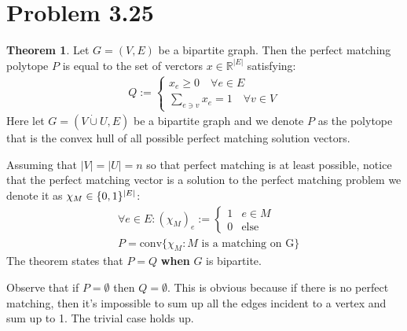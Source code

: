 \documentclass[]{article}
\theoremstyle{definition}
\newtheorem{theorem}{Theorem}       %
\begin{document}
\section{Problem 3.25}
    \begin{theorem}
        Let $G =(V, E)$ be a bipartite graph. Then the perfect matching polytope $P$ is equal to the set of verctors $x\in \mathbb R^{|E|}$ satisfying: 
        \begin{align}\label{definition:Q}
            Q:= 
            \begin{cases}
                x_e \ge 0 \quad \forall e \in E
                \\
                \sum_{e\ni v}^{}x_e = 1\quad \forall v \in V    
            \end{cases}
        \end{align}
        Here let $G = (V\dot\cup U, E)$ be a bipartite graph and we denote $P$ as the polytope that is the convex hull of all possible perfect matching solution vectors. 
        \par
        Assuming that $|V| = |U| = n$ so that perfect matching is at least possible, notice that the perfect matching vector is a solution to the perfect matching problem we denote it as $\chi_M\in \mathbb \{0, 1\}^{|E|}$: 
        \begin{align}
            & \forall e\in E: (\chi_M)_e := 
            \begin{cases}
                1 & e \in M
                \\
                0 & \text{else}
            \end{cases}
            \\
            & P = \text{conv}\{\chi_M: M \text{ is a matching on G}\}
        \end{align}
        The theorem states that $P = Q$ \textbf{when} $G$ is bipartite. 
    \end{theorem}
    Observe that if $P = \emptyset$ then $Q = \emptyset$. This is obvious because if there is no perfect matching, then it's impossible to sum up all the edges incident to a vertex and sum up to 1. The trivial case holds up. 
\end{document}

